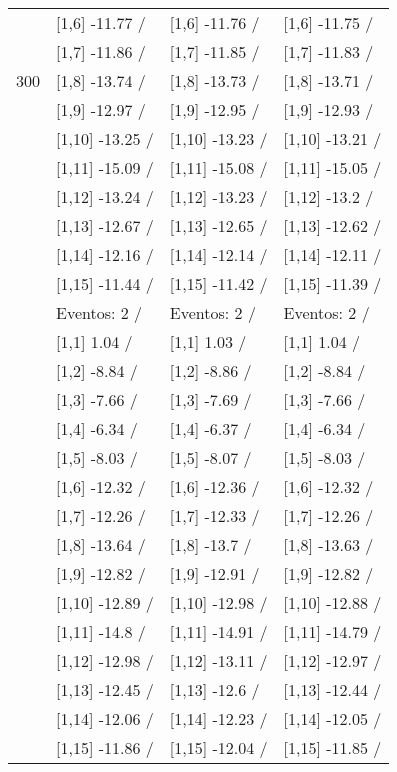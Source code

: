 \begin{table}
\begin{tabular}[t]{llll}
 & {}[1,6] -11.77  / & {}[1,6] -11.76  / & {}[1,6] -11.75  /\\
 & {}[1,7] -11.86  / & {}[1,7] -11.85  / & {}[1,7] -11.83  /\\
300 & {}[1,8] -13.74  / & {}[1,8] -13.73  / & {}[1,8] -13.71  /\\
\addlinespace
 & {}[1,9] -12.97  / & {}[1,9] -12.95  / & {}[1,9] -12.93  /\\
 & {}[1,10] -13.25  / & {}[1,10] -13.23  / & {}[1,10] -13.21  /\\
 & {}[1,11] -15.09  / & {}[1,11] -15.08  / & {}[1,11] -15.05  /\\
 & {}[1,12] -13.24  / & {}[1,12] -13.23  / & {}[1,12] -13.2  /\\
 & {}[1,13] -12.67  / & {}[1,13] -12.65  / & {}[1,13] -12.62  /\\
\addlinespace
 & {}[1,14] -12.16  / & {}[1,14] -12.14  / & {}[1,14] -12.11  /\\
 & {}[1,15] -11.44  / & {}[1,15] -11.42  / & {}[1,15] -11.39  /\\
 & Eventos:  2 / & Eventos:  2 / & Eventos:  2 /\\
 & {}[1,1] 1.04  / & {}[1,1] 1.03  / & {}[1,1] 1.04  /\\
 & {}[1,2] -8.84  / & {}[1,2] -8.86  / & {}[1,2] -8.84  /\\
\addlinespace
 & {}[1,3] -7.66  / & {}[1,3] -7.69  / & {}[1,3] -7.66  /\\
 & {}[1,4] -6.34  / & {}[1,4] -6.37  / & {}[1,4] -6.34  /\\
 & {}[1,5] -8.03  / & {}[1,5] -8.07  / & {}[1,5] -8.03  /\\
 & {}[1,6] -12.32  / & {}[1,6] -12.36  / & {}[1,6] -12.32  /\\
 & {}[1,7] -12.26  / & {}[1,7] -12.33  / & {}[1,7] -12.26  /\\
\addlinespace
500 & {}[1,8] -13.64  / & {}[1,8] -13.7  / & {}[1,8] -13.63  /\\
 & {}[1,9] -12.82  / & {}[1,9] -12.91  / & {}[1,9] -12.82  /\\
 & {}[1,10] -12.89  / & {}[1,10] -12.98  / & {}[1,10] -12.88  /\\
 & {}[1,11] -14.8  / & {}[1,11] -14.91  / & {}[1,11] -14.79  /\\
 & {}[1,12] -12.98  / & {}[1,12] -13.11  / & {}[1,12] -12.97  /\\
\addlinespace
 & {}[1,13] -12.45  / & {}[1,13] -12.6  / & {}[1,13] -12.44  /\\
 & {}[1,14] -12.06  / & {}[1,14] -12.23  / & {}[1,14] -12.05  /\\
 & {}[1,15] -11.86  / & {}[1,15] -12.04  / & {}[1,15] -11.85  /\\
\bottomrule
\end{tabular}
\end{table}
